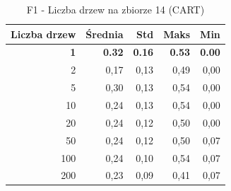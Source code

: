 \begin{table}[htbp]
\centering
\small
\setlength{\tabcolsep}{6pt}
\renewcommand{\arraystretch}{1.2}
\caption{F1 - Liczba drzew na zbiorze 14 (CART)}
\label{tab:CART_tree_count_14_f1}
\begin{tabular}{r|r|r|r|r}
\toprule
Liczba drzew & Średnia & Std & Maks & Min \\
\hline
\textbf{1} & \textbf{0.32} & \textbf{0.16} & \textbf{0.53} & \textbf{0.00} \\
2 & 0,17 & 0,13 & 0,49 & 0,00 \\
5 & 0,30 & 0,13 & 0,54 & 0,00 \\
10 & 0,24 & 0,13 & 0,54 & 0,00 \\
20 & 0,24 & 0,12 & 0,50 & 0,00 \\
50 & 0,24 & 0,12 & 0,50 & 0,07 \\
100 & 0,24 & 0,10 & 0,54 & 0,07 \\
200 & 0,23 & 0,09 & 0,41 & 0,07 \\
\bottomrule
\end{tabular}
\end{table}